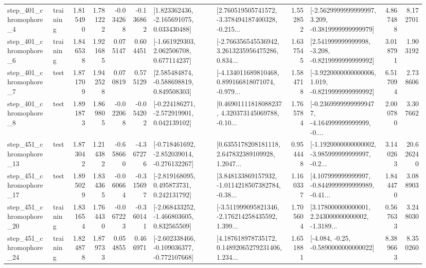 \begin{tabular}{llrrrrllrlrr}
   step\_401\_chromophore\_4 &  training &      1.815490 &    1.781222 &     -0.034268 & -0.136862 &    [1.823362436, -2.165691075, 0.033430488] &  [2.760519505741572, -3.378494187400328, -0.215... &       1.552852 &  [-2.5629999999999997, 3.209, -0.3819999999999979] &            4.867488 &          8.172701 \\
   step\_401\_chromophore\_6 &  training &      1.846538 &    1.921685 &      0.075147 &  0.604451 &    [-1.661929303, 2.062506708, 0.677114237] &  [-2.766356545536942, 3.2613235956475286, 0.834... &       1.637545 &   [2.541999999999998, -3.208, -0.8219999999999992] &            3.018791 &          1.903192 \\
   step\_401\_chromophore\_7 &      test &      1.871709 &    1.942528 &      0.070819 &  0.575129 &    [2.585484874, -0.588698819, 0.849508303] &  [-4.134011689810468, 0.899166818071074, -0.979... &       1.584718 &  [-3.9220000000000006, 1.019, -0.8219999999999992] &            6.517094 &          2.738606 \\
   step\_401\_chromophore\_8 &      test &      1.891873 &    1.869805 &     -0.022068 & -0.054202 &   [-0.224186271, -2.572919901, 0.042139102] &  [0.46901111818088237, 4.320373145069788, -0.10... &       1.765784 &  [-0.23699999999999477, -4.164999999999999, -0.... &            2.000780 &          3.307662 \\
  step\_451\_chromophore\_13 &      test &      1.873042 &    1.214382 &     -0.658660 & -4.367276 &  [-0.718461692, -2.852039014, -0.276132267] &  [0.6355178208181118, 2.647832389109928, 1.2047... &       0.954448 &  [-1.1920000000000002, -3.985999999999997, -0.2... &            3.140263 &         20.626240 \\
  step\_451\_chromophore\_17 &      test &      1.895029 &    1.834365 &     -0.060664 & -0.315697 &    [-2.819168095, 0.495873731, 0.242131792] &  [3.848133869157932, -1.0114218507382784, -0.38... &       1.160337 &  [4.107999999999997, -0.8449999999999989, -0.41... &            1.844470 &          3.088903 \\
  step\_451\_chromophore\_20 &  training &      1.831654 &    1.764430 &     -0.067223 & -0.360141 &   [-2.068433252, -1.466803605, 0.832565509] &  [-3.511999095821346, -2.176214258435592, 1.399... &       1.705604 &  [3.178000000000001, 2.243000000000002, -1.3189... &            0.567633 &          3.248030 \\
  step\_451\_chromophore\_24 &  training &      1.824878 &    1.879733 &      0.054855 &  0.466971 &  [-2.602338466, -0.109036377, -0.772107668] &  [4.187618978735172, 0.14892065279231406, 1.234... &       1.651881 &               [-4.084, -0.25, -0.5890000000000022] &            8.389663 &          8.350260 \\

\end{tabular}
